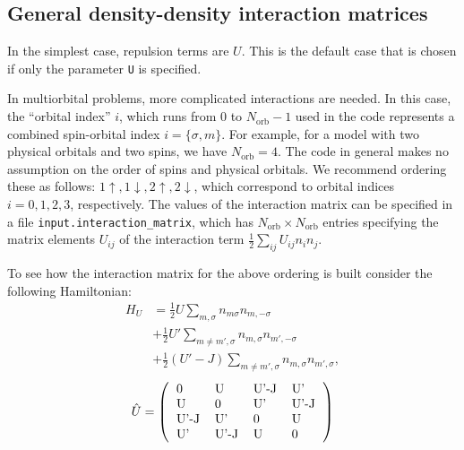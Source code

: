 \documentclass[aps,prb,floatfix,superscriptaddress,twocolumn,notitlepage]{revtex4-1}
\begin{document}
\subsection{General density-density interaction matrices}
\label{umatrix}
In the simplest case, repulsion terms are $U$. This is the default case that is chosen if only the parameter \verb#U# is specified.

In multiorbital problems, more complicated interactions are needed.
In this case, the ``orbital index'' $i$, which runs from $0$ to $N_{\text{orb}}-1$ used in the code represents a combined spin-orbital index $i=\{\sigma,m\}$. For example, for a model with two physical orbitals and two spins, we have $N_{\text{orb}}=4$.
The code in general makes no assumption on the order of spins and physical orbitals. 
We recommend ordering these as follows: $1\uparrow, 1\downarrow, 2\uparrow, 2\downarrow$, which correspond to orbital indices $i=0,1,2,3$, respectively.
The values of the interaction matrix can be specified in a file \verb#input.interaction_matrix#, which has $N_\text{orb}\times N_\text{orb}$ entries specifying the matrix elements $U_{ij}$ of the interaction term $\frac{1}{2}\sum_{ij}U_{ij}n_i n_j$.

To see how the interaction matrix for the above ordering is built consider the following Hamiltonian:
\begin{align}
H_{U} &=\frac{1}{2}U\sum_{m,\sigma} n_{m\sigma}n_{m,-\sigma} \\ \nonumber &+ \frac{1}{2}U'\sum_{m\neq m',\sigma}n_{m,\sigma}n_{m',-\sigma}
\\ \nonumber&+ \frac{1}{2}(U'-J)\sum_{m\neq m',\sigma} n_{m,\sigma}n_{m',\sigma}, 
\end{align}
\begin{equation}
\hat{U}=\left(\begin{tabular}{llll}
0 & U & U'-J & U'\\
U & 0 & U' & U'-J\\
U'-J & U' & 0 & U\\
U' & U'-J & U & 0\\
\end{tabular}\right)
\end{equation}
\end{document}
